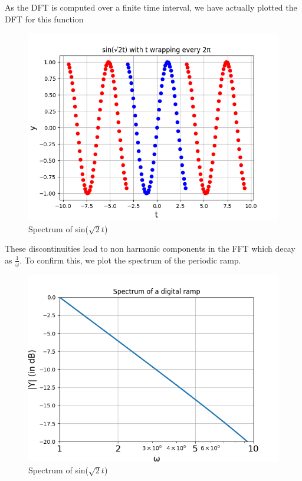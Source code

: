 \documentclass[11pt, a4paper]{article}
\begin{document}
As the DFT is computed over a finite time interval, we have actually plotted the DFT for this function
\begin{figure}[h!]
\centering
\includegraphics[scale=0.6]{fig10-3.png}
\caption{Spectrum of sin($\sqrt{2}t$)}
\label{fig:universe}
\end{figure}

These discontinuities lead to  non harmonic components in the FFT which decay as \(\frac{1}{\omega}\). To confirm
this, we plot the spectrum of the periodic ramp.
\begin{figure}[h!]
\centering
\includegraphics[scale=0.6]{fig10-4.png}
\caption{Spectrum of sin($\sqrt{2}t$)}
\label{fig:universe}
\end{figure}
\end{document}
